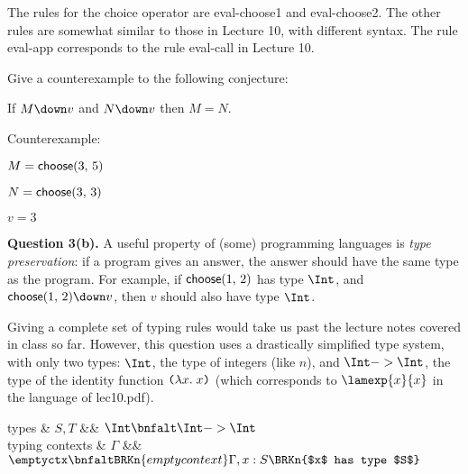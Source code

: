 The rules for the choice operator are eval-choose1 and eval-choose2.
The other rules are somewhat similar to those in Lecture 10, with different syntax.
The rule eval-app corresponds to the rule eval-call in Lecture 10.

\medskip

\vspace*{-1.5ex}

\vspace*{2ex}

Give a counterexample to the following conjecture:

\begin{conjecture}
  If $M \down v$ and $N \down v$ then $M = N$.
\end{conjecture}

Counterexample:

\bigskip

$M = \textsf{choose}({3},\,{5})
$ \bigskip

$N = \textsf{choose}({3},\,{3})
$\bigskip

$v = 3
$

\vfill

\clearpage

\textbf{Question 3(b).}
A useful property of (some) programming languages is \emph{type preservation}:
if a program gives an answer, the answer should have the same type as the program.
For example, if $\textsf{choose}({1},\,{2})$ has type $\Int$, and $\DC{1}{2} \down v$, then
$v$ should also have type $\Int$.

Giving a complete set of typing rules would take us past the lecture notes covered
in class so far.  However, this question uses a drastically simplified type system,
with only two
types: $\Int$, the type of integers (like $n$), and $\Int -> \Int$, the type of the
identity function $\texttt(\lambda{x}.\;{x}\texttt)$ (which corresponds to $\lamexp{x}{x}$ in the
language of lec10.pdf).

\begin{grammar}
 types & $S, T$
   &\bnfas&
   $\Int
   \bnfalt
   \Int -> \Int
   $
\\[1ex]
typing contexts & $\Gamma$
&\bnfas&
$
\emptyctx
\bnfaltBRKn{empty context}
\Gamma, x : S
\BRKn{$x$ has type $S$}
$
\end{grammar}

